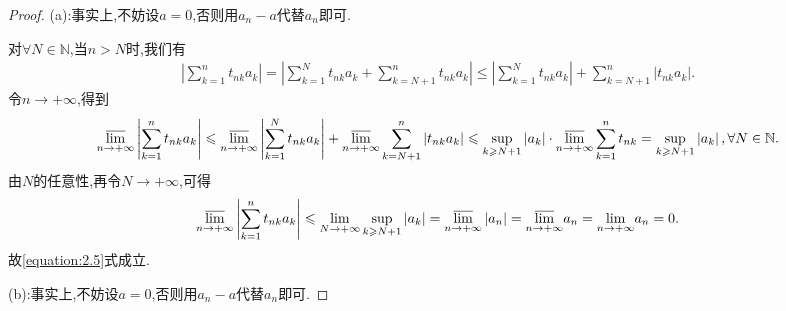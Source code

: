 \documentclass[../../main.tex]{subfiles}%
\begin{document}
\begin{proof}
(a):事实上,不妨设$a=0$,否则用$a_n-a$代替$a_n$即可.

对$\forall N\in\mathbb{N}$,当$n>N$时,我们有
\begin{align*}
\left| \sum\limits_{k=1}^n{t_{nk}a_k} \right|=\left| \sum\limits_{k=1}^N{t_{nk}a_k}+\sum\limits_{k=N+1}^n{t_{nk}a_k} \right|\leqslant \left| \sum\limits_{k=1}^N{t_{nk}a_k} \right|+\sum\limits_{k=N+1}^n{\left| t_{nk}a_k \right|}.
\end{align*}
令$n\to+\infty$,得到
\begin{align*}
\underset{n\rightarrow +\infty}{{\varlimsup }}\left| \sum\limits_{k=1}^n{t_{nk}a_k} \right|\leqslant \underset{n\rightarrow +\infty}{{\varlimsup }}\left| \sum\limits_{k=1}^N{t_{nk}a_k} \right|+\underset{n\rightarrow +\infty}{{\varlimsup }}\sum\limits_{k=N+1}^n{\left| t_{nk}a_k \right|}\leqslant \mathop {\mathrm{sup}} \limits_{k\geqslant N+1}\left| a_k \right|\cdot \underset{n\rightarrow +\infty}{{\varlimsup }}\sum\limits_{k=1}^n{t_{nk}}=\mathop {\mathrm{sup}} \limits_{k\geqslant N+1}\left| a_k \right|,\forall N\in \mathbb{N} .
\end{align*}
由$N$的任意性,再令$N\to+\infty$,可得
\begin{align*}
\underset{n\rightarrow +\infty}{{\varlimsup }}\left| \sum\limits_{k=1}^n{t_{nk}a_k} \right|\leqslant \underset{N\rightarrow +\infty}{\lim}\mathop {\mathrm{sup}} \limits_{k\geqslant N+1}\left| a_k \right|=\underset{n\rightarrow +\infty}{{\varlimsup }}\left| a_n \right|=\underset{n\rightarrow +\infty}{{\varlimsup }}a_n=\underset{n\rightarrow +\infty}{\lim}a_n=0.
\end{align*}
故\eqref{equation:2.5}式成立.

(b):事实上,不妨设$a=0$,否则用$a_n-a$代替$a_n$即可.


\end{proof}
\end{document}
